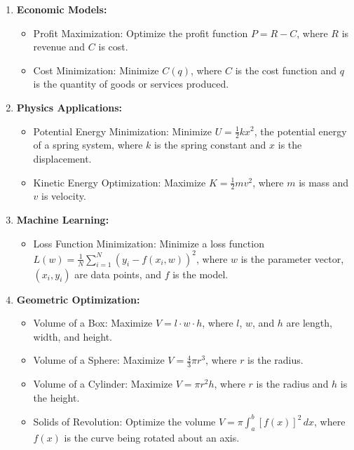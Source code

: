 \begin{enumerate}
    \item \textbf{Economic Models:} 
    \begin{itemize}
        \item Profit Maximization: Optimize the profit function \( P = R - C \), where \( R \) is revenue and \( C \) is cost.
        \item Cost Minimization: Minimize \( C(q) \), where \( C \) is the cost function and \( q \) is the quantity of goods or services produced.
    \end{itemize}
    
    \item \textbf{Physics Applications:} 
    \begin{itemize}
        \item Potential Energy Minimization: Minimize \( U = \frac{1}{2}kx^2 \), the potential energy of a spring system, where \( k \) is the spring constant and \( x \) is the displacement.
        \item Kinetic Energy Optimization: Maximize \( K = \frac{1}{2}mv^2 \), where \( m \) is mass and \( v \) is velocity.
    \end{itemize}
    
    \item \textbf{Machine Learning:} 
    \begin{itemize}
        \item Loss Function Minimization: Minimize a loss function \( L(w) = \frac{1}{N} \sum_{i=1}^N (y_i - f(x_i, w))^2 \), where \( w \) is the parameter vector, \( (x_i, y_i) \) are data points, and \( f \) is the model.
    \end{itemize}
    
    \item \textbf{Geometric Optimization:} 
    \begin{itemize}
        \item Volume of a Box: Maximize \( V = l \cdot w \cdot h \), where \( l \), \( w \), and \( h \) are length, width, and height.
        \item Volume of a Sphere: Maximize \( V = \frac{4}{3}\pi r^3 \), where \( r \) is the radius.
        \item Volume of a Cylinder: Maximize \( V = \pi r^2 h \), where \( r \) is the radius and \( h \) is the height.
        \item Solids of Revolution: Optimize the volume \( V = \pi \int_a^b [f(x)]^2 \, dx \), where \( f(x) \) is the curve being rotated about an axis.
    \end{itemize}
\end{enumerate}

